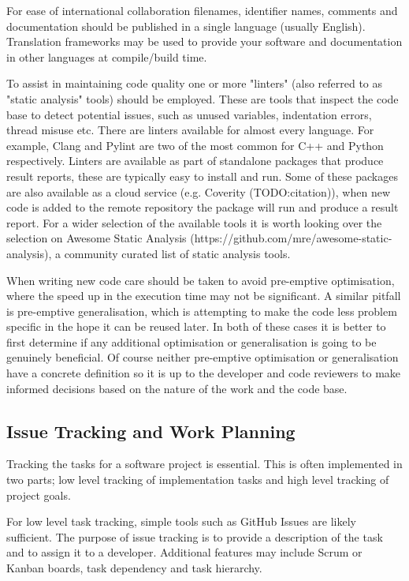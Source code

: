 \documentclass[jnr]{iosart2x}
\begin{document}
For ease of international collaboration filenames, identifier names, comments and documentation should be published in a single language (usually English).
Translation frameworks may be used to provide your software and documentation in other languages at compile/build time.

To assist in maintaining code quality one or more "linters" (also referred to as "static analysis" tools) should be employed.
These are tools that inspect the code base to detect potential issues, such as unused variables, indentation errors, thread misuse etc.
There are linters available for almost every language.
For example, Clang \cite{Clang} and Pylint \cite{Pylint} are two of the most common for C++ and Python respectively.
Linters are available as part of standalone packages that produce result reports, these are typically easy to install and run.
Some of these packages are also available as a cloud service (e.g. Coverity \cite{} (TODO:citation)), when new code is added to the remote repository the package will run and produce a result report.
For a wider selection of the available tools it is worth looking over the selection on Awesome Static Analysis (https://github.com/mre/awesome-static-analysis), a community curated list of static analysis tools.

When writing new code care should be taken to avoid pre-emptive optimisation, where the speed up in the execution time may not be significant.
A similar pitfall is pre-emptive generalisation, which is attempting to make the code less problem specific in the hope it can be reused later.
In both of these cases it is better to first determine if any additional optimisation or generalisation is going to be genuinely beneficial.
Of course neither pre-emptive optimisation or generalisation have a concrete definition so it is up to the developer and code reviewers to make informed decisions based on the nature of the work and the code base.

\subsection{Issue Tracking and Work Planning}
\label{Issue tracking and work planning}

Tracking the tasks for a software project is essential.
This is often implemented in two parts; low level tracking of implementation tasks and high level tracking of project goals.

For low level task tracking, simple tools such as GitHub Issues are likely sufficient.
The purpose of issue tracking is to provide a description of the task and to assign it to a developer.
Additional features may include Scrum or Kanban boards, task dependency and task hierarchy.
\end{document}
